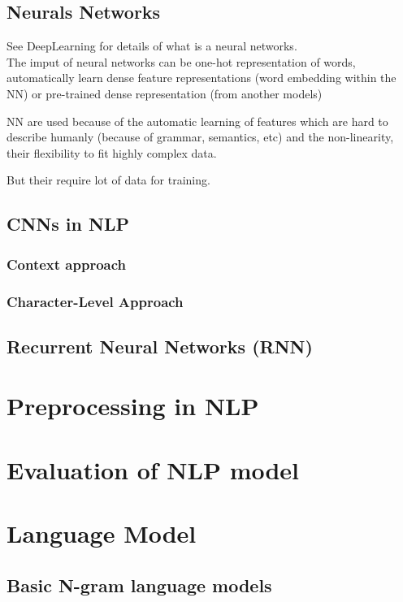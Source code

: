 		\subsection{Neurals Networks}
			See DeepLearning for details of what is a neural networks. \\

			The imput of neural networks can be one-hot representation of words, automatically learn dense feature representations (word embedding within the NN) or pre-trained dense representation (from another models)

			NN are used because of the automatic learning of features which are hard to describe humanly (because of grammar, semantics, etc) and the non-linearity, their flexibility to fit highly complex data. 

			But their require lot of data for training. 


		\subsection{CNNs in NLP}

			\subsubsection{Context approach}

			\subsubsection*{Character-Level Approach}

		\subsection{Recurrent Neural Networks (RNN)}

		\section{Preprocessing in NLP}

		\section{Evaluation of NLP model}


		\section{Language Model}

			\subsection{Basic N-gram language models}

